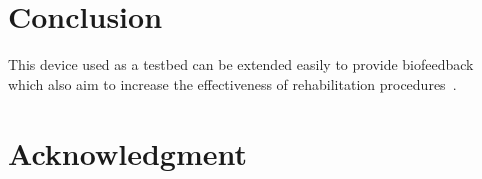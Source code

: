 \documentclass[conference]{IEEEtran}
\begin{document}
\section*{Conclusion}

This device used as a testbed can be extended easily to provide biofeedback which also aim to increase the effectiveness of rehabilitation procedures~\cite{Bowman2021}.


\section*{Acknowledgment}


%
%
%





%
\end{document}
